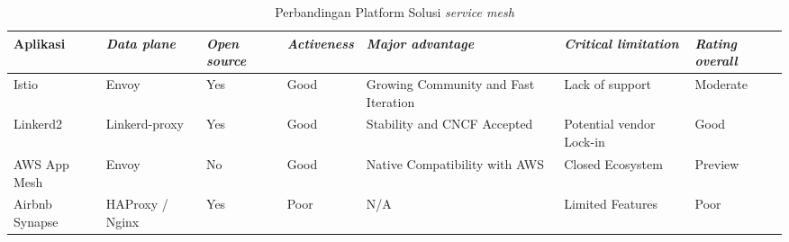 \begin{longtable}{|p{1.5cm}|p{1.5cm}|p{1.5cm}|p{1.5cm}|p{1.5cm}|p{1.5cm}|p{1.5cm}|}
  \caption{Perbandingan Platform Solusi \textit{service mesh} \parencite{li2019}} \label{tab:perbandingan-service-mesh}                                                                                                                                \\
  \hline
  \rowcolor{gray!30} \textbf{Aplikasi} & \textbf{\textit{Data plane}} & \textbf{\textit{Open source}} & \textbf{\textit{Activeness}} & \textbf{\textit{Major advantage}}    & \textbf{\textit{Critical limitation}} & \textbf{\textit{Rating overall}} \\
  \hline
  \endfirsthead

  \endhead

  Istio                                & Envoy                        & Yes                           & Good                         & Growing Community and Fast Iteration & Lack of support                       & Moderate \tabularnewline \hline

  Linkerd2                             & Linkerd-proxy                & Yes                           & Good                         & Stability and CNCF Accepted          & Potential vendor Lock-in              & Good \tabularnewline \hline

  AWS App Mesh                         & Envoy                        & No                            & Good                         & Native Compatibility with AWS        & Closed Ecosystem                      & Preview \tabularnewline \hline

  Airbnb Synapse                       & HAProxy / Nginx              & Yes                           & Poor                         & N/A                                  & Limited Features                      & Poor \tabularnewline \hline

  \hline
\end{longtable}
